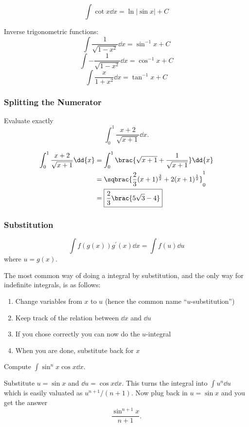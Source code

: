 \[ \int \cot x \dd{x} = \ln|\sin x| + C \]

Inverse trigonometric functions:
\[ \int\frac{1}{\sqrt{1-x^2}}\dd{x} = \sin^{-1}x + C \]
\[ \int-\frac{1}{\sqrt{1-x^2}}\dd{x} = \cos^{-1}x + C \]
\[ \int\frac{x}{1+x^2}\dd{x} = \tan^{-1}x + C \]

\subsubsection{Splitting the Numerator}
\begin{exercise}{}{}
Evaluate exactly
\[ \int_0^1\frac{x+2}{\sqrt{x+1}}\dd{x}. \]
\end{exercise}
\begin{solution}
\begin{align*}
\int_0^1\frac{x+2}{\sqrt{x+1}}\dd{x}
&= \int_0^1\brac{\sqrt{x+1}+\frac{1}{\sqrt{x+1}}}\dd{x} \\
&= \sqbrac{\frac{2}{3}(x+1)^\frac{3}{2}+2(x+1)^\frac{1}{2}}_0^1 \\
&= \boxed{\frac{2}{3}\brac{5\sqrt{3}-4}}
\end{align*}
\end{solution}

\subsubsection{Substitution}
\begin{equation}
\int f(g(x)) g^\prime (x)\dd{x} = \int f(u) \dd{u}
\end{equation}
where $u=g(x)$.

The most common way of doing a integral by substitution, and the only way for indefinite integrals, is as follows:
\begin{enumerate}
\item Change variables from $x$ to $u$ (hence the common name ``$u$-substitution'')
\item Keep track of the relation between $\dd{x}$ and $\dd{u}$
\item If you chose correctly you can now do the $u$-integral
\item When you are done, substitute back for $x$
\end{enumerate}

\begin{exercise}{}{}
Compute $\int\sin^nx\cos x\dd{x}$.
\end{exercise}
\begin{solution}
Substitute $u = \sin x$ and $\dd{u} = \cos x\dd{x}$. This turns the integral into $\int u^n\dd{u}$ which is easily valuated as $u^{n+1}/(n+1)$. Now plug back in $u = \sin x$ and you get the answer
\[ \frac{\sin^{n+1}x}{n+1}. \]
\end{solution}

